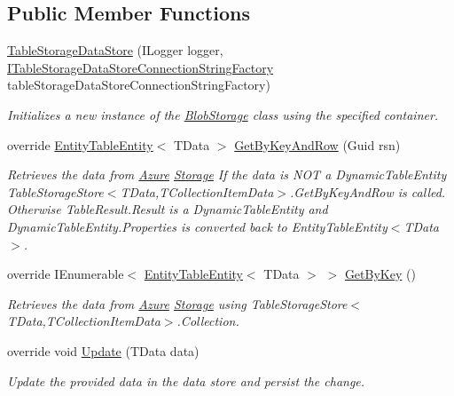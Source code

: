 \subsection*{Public Member Functions}
\begin{DoxyCompactItemize}
\item 
\hyperlink{classCqrs_1_1Azure_1_1Storage_1_1DataStores_1_1TableStorageDataStore_a25a32a83c14eb5068f5bc9bcacfa15f6_a25a32a83c14eb5068f5bc9bcacfa15f6}{Table\+Storage\+Data\+Store} (I\+Logger logger, \hyperlink{interfaceCqrs_1_1Azure_1_1BlobStorage_1_1DataStores_1_1ITableStorageDataStoreConnectionStringFactory}{I\+Table\+Storage\+Data\+Store\+Connection\+String\+Factory} table\+Storage\+Data\+Store\+Connection\+String\+Factory)
\begin{DoxyCompactList}\small\item\em Initializes a new instance of the \hyperlink{namespaceCqrs_1_1Azure_1_1BlobStorage}{Blob\+Storage} class using the specified container. \end{DoxyCompactList}\item 
override \hyperlink{classCqrs_1_1Azure_1_1BlobStorage_1_1EntityTableEntity}{Entity\+Table\+Entity}$<$ T\+Data $>$ \hyperlink{classCqrs_1_1Azure_1_1Storage_1_1DataStores_1_1TableStorageDataStore_a61e3fc6404283606ec41a5e5a3c72ac8_a61e3fc6404283606ec41a5e5a3c72ac8}{Get\+By\+Key\+And\+Row} (Guid rsn)
\begin{DoxyCompactList}\small\item\em Retrieves the data from \hyperlink{namespaceCqrs_1_1Azure}{Azure} \hyperlink{namespaceCqrs_1_1Azure_1_1Storage}{Storage} If the data is N\+OT a Dynamic\+Table\+Entity Table\+Storage\+Store$<$\+T\+Data,\+T\+Collection\+Item\+Data$>$.\+Get\+By\+Key\+And\+Row is called. Otherwise Table\+Result.\+Result is a Dynamic\+Table\+Entity and Dynamic\+Table\+Entity.\+Properties is converted back to Entity\+Table\+Entity$<$\+T\+Data$>$. \end{DoxyCompactList}\item 
override I\+Enumerable$<$ \hyperlink{classCqrs_1_1Azure_1_1BlobStorage_1_1EntityTableEntity}{Entity\+Table\+Entity}$<$ T\+Data $>$ $>$ \hyperlink{classCqrs_1_1Azure_1_1Storage_1_1DataStores_1_1TableStorageDataStore_a79043a9d497f4027cf87e5ff78fe6098_a79043a9d497f4027cf87e5ff78fe6098}{Get\+By\+Key} ()
\begin{DoxyCompactList}\small\item\em Retrieves the data from \hyperlink{namespaceCqrs_1_1Azure}{Azure} \hyperlink{namespaceCqrs_1_1Azure_1_1Storage}{Storage} using Table\+Storage\+Store$<$\+T\+Data,\+T\+Collection\+Item\+Data$>$.\+Collection. \end{DoxyCompactList}\item 
override void \hyperlink{classCqrs_1_1Azure_1_1Storage_1_1DataStores_1_1TableStorageDataStore_a9afab2cca66ca4453b2ab56916578c7d_a9afab2cca66ca4453b2ab56916578c7d}{Update} (T\+Data data)
\begin{DoxyCompactList}\small\item\em Update the provided {\itshape data}  in the data store and persist the change. \end{DoxyCompactList}\end{DoxyCompactItemize}
